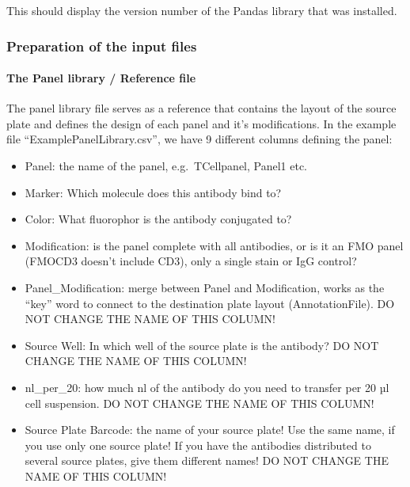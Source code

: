 \documentclass[
]{article}
\providecommand{\tightlist}{%
  \setlength{\itemsep}{0pt}\setlength{\parskip}{0pt}}
\begin{document}
This should display the version number of the Pandas library that was
installed.

\hypertarget{preparation-of-the-input-files}{%
\subsubsection{Preparation of the input
files}\label{preparation-of-the-input-files}}

\hypertarget{the-panel-library-reference-file}{%
\paragraph{The Panel library / Reference
file}\label{the-panel-library-reference-file}}

The panel library file serves as a reference that contains the layout of
the source plate and defines the design of each panel and it's
modifications. In the example file ``ExamplePanelLibrary.csv'', we have
9 different columns defining the panel:

\begin{itemize}
\tightlist
\item
  Panel: the name of the panel, e.g.~TCellpanel, Panel1 etc.\\
\item
  Marker: Which molecule does this antibody bind to?\\
\item
  Color: What fluorophor is the antibody conjugated to?\\
\item
  Modification: is the panel complete with all antibodies, or is it an
  FMO panel (FMOCD3 doesn't include CD3), only a single stain or IgG
  control?\\
\item
  Panel\_Modification: merge between Panel and Modification, works as
  the ``key'' word to connect to the destination plate layout
  (AnnotationFile). DO NOT CHANGE THE NAME OF THIS COLUMN!\\
\item
  Source Well: In which well of the source plate is the antibody? DO NOT
  CHANGE THE NAME OF THIS COLUMN!\\
\item
  nl\_per\_20: how much nl of the antibody do you need to transfer per
  20 µl cell suspension. DO NOT CHANGE THE NAME OF THIS COLUMN!\\
\item
  Source Plate Barcode: the name of your source plate! Use the same
  name, if you use only one source plate! If you have the antibodies
  distributed to several source plates, give them different names! DO
  NOT CHANGE THE NAME OF THIS COLUMN!
\end{itemize}
\end{document}
